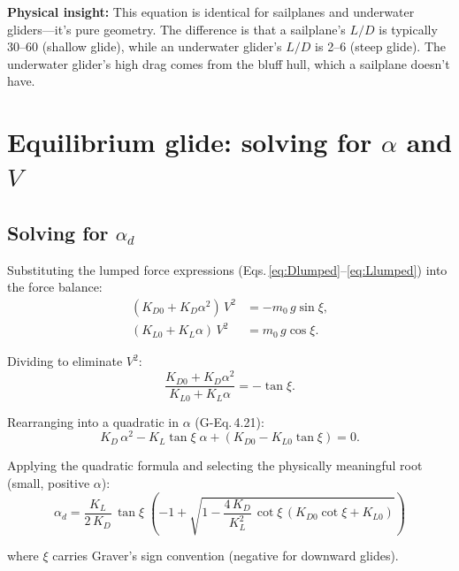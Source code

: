 \documentclass[11pt,a4paper]{article}
\newcommand{\insight}[1]{\par\smallskip\noindent\colorbox{green!8}{\parbox{\dimexpr\linewidth-2\fboxsep}{%
  \small\textbf{Physical insight:} #1}}\smallskip}
\begin{document}
\insight{This equation is identical for sailplanes and underwater gliders---it's
pure geometry.  The difference is that a sailplane's $L/D$ is typically 30--60
(shallow glide), while an underwater glider's $L/D$ is 2--6 (steep glide).  The
underwater glider's high drag comes from the bluff hull, which a sailplane doesn't have.}


\section{Equilibrium glide: solving for $\alpha$ and $V$}
\label{sec:equilibrium}

\subsection{Solving for $\alpha_d$}

Substituting the lumped force expressions (Eqs.\,\ref{eq:Dlumped}--\ref{eq:Llumped})
into the force balance:
\begin{align}
  (K_{D0} + K_D\alpha^2)\,V^2 &= -m_0\,g\sin\xi, \label{eq:fb1} \\
  (K_{L0} + K_L\alpha)\,V^2 &= m_0\,g\cos\xi. \label{eq:fb2}
\end{align}

Dividing to eliminate $V^2$:
\begin{equation}
  \frac{K_{D0} + K_D\alpha^2}{K_{L0} + K_L\alpha} = -\tan\xi.
  \label{eq:alphabalance}
\end{equation}

Rearranging into a quadratic in $\alpha$ (G-Eq.\,4.21):
\begin{equation}
  K_D\,\alpha^2 - K_L\tan\xi\;\alpha + (K_{D0} - K_{L0}\tan\xi) = 0.
  \label{eq:alphaquad}
\end{equation}

Applying the quadratic formula and selecting the physically meaningful root
(small, positive $\alpha$):
\begin{equation}
  \boxed{
    \alpha_d = \frac{K_L}{2\,K_D}\,\tan\xi\;
    \left(-1 + \sqrt{1 - \frac{4\,K_D}{K_L^2}\,\cot\xi\,(K_{D0}\cot\xi + K_{L0})}\right)
  }
  \label{eq:alpha_d}
\end{equation}

where $\xi$ carries Graver's sign convention (negative for downward glides).
\end{document}
